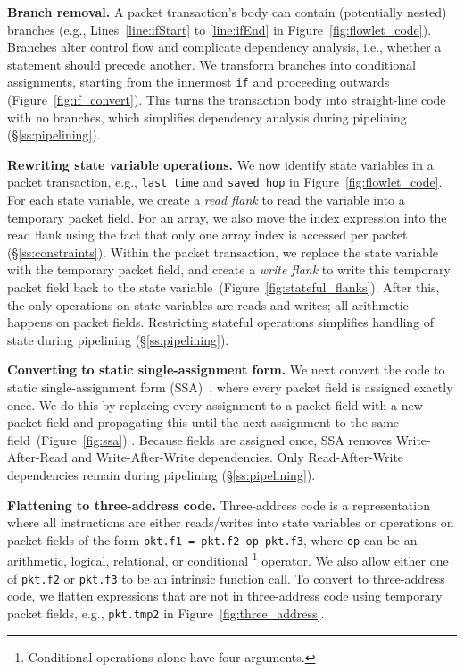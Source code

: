 \medskip
\noindent
\textbf{Branch removal.} A packet transaction's body can contain (potentially
nested) branches (e.g., Lines~\ref{line:ifStart} to \ref{line:ifEnd} in
Figure~\ref{fig:flowlet_code}).  Branches alter control flow and complicate
dependency analysis, i.e.,  whether a statement should precede another.  We
transform branches into conditional assignments, starting from the innermost
\texttt{if} and proceeding outwards (Figure~\ref{fig:if_convert}).  This turns
the transaction body into straight-line code with no branches, which simplifies
dependency analysis during pipelining (\S\ref{ss:pipelining}).

\medskip
\noindent
\textbf{Rewriting state variable operations.} We now identify state variables
in a packet transaction, e.g., \texttt{last\_time} and \texttt{saved\_hop} in
Figure~\ref{fig:flowlet_code}.  For each state variable, we create a
\textit{read flank} to read the variable into a temporary packet field.
For an array, we also move the index expression into the read flank using the
fact that only one array index is accessed per packet (\S\ref{ss:constraints}).
Within the packet transaction, we replace the state variable with the temporary
packet field, and create a \textit{write flank} to write this temporary packet
field back to the state variable~(Figure~\ref{fig:stateful_flanks}). After
this, the only operations on state variables are reads and writes; all
arithmetic happens on packet fields. Restricting stateful operations simplifies
handling of state during pipelining (\S\ref{ss:pipelining}).

\medskip
\noindent
\textbf{Converting to static single-assignment form.} We next convert the code
to static single-assignment form (SSA)~\cite{ssa}, where every packet field is
assigned exactly once. We do this by replacing every assignment to a packet
field with a new packet field and propagating this until the next assignment to
the same field~(Figure~\ref{fig:ssa}) .  Because fields are assigned once, SSA
removes Write-After-Read and Write-After-Write dependencies.  Only
Read-After-Write dependencies remain during pipelining (\S\ref{ss:pipelining}).

\medskip
\noindent
\textbf{Flattening to three-address code.} Three-address code is a
representation where all instructions are either reads/writes into state
variables or operations on packet fields of the form \texttt{pkt.f1 = pkt.f2 op
pkt.f3}, where \texttt{op} can be an arithmetic, logical, relational, or
conditional \footnote{Conditional operations alone have four arguments.}
operator.  We also allow either one of {\tt pkt.f2} or {\tt pkt.f3} to be an
intrinsic function call.  To convert to three-address code, we flatten
expressions that are not in three-address code using
temporary packet fields, e.g., {\tt pkt.tmp2} in Figure~\ref{fig:three_address}.

